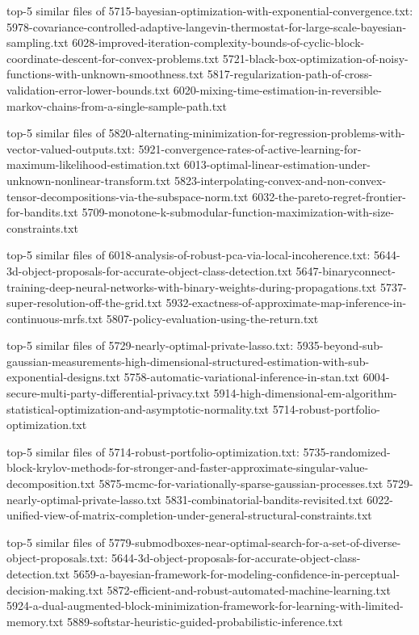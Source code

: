 \documentclass[11pt]{article}
\begin{document}
top-5 similar files of
5715-bayesian-optimization-with-exponential-convergence.txt:
5978-covariance-controlled-adaptive-langevin-thermostat-for-large-scale-bayesian-sampling.txt
6028-improved-iteration-complexity-bounds-of-cyclic-block-coordinate-descent-for-convex-problems.txt
5721-black-box-optimization-of-noisy-functions-with-unknown-smoothness.txt
5817-regularization-path-of-cross-validation-error-lower-bounds.txt
6020-mixing-time-estimation-in-reversible-markov-chains-from-a-single-sample-path.txt

top-5 similar files of
5820-alternating-minimization-for-regression-problems-with-vector-valued-outputs.txt:
5921-convergence-rates-of-active-learning-for-maximum-likelihood-estimation.txt
6013-optimal-linear-estimation-under-unknown-nonlinear-transform.txt
5823-interpolating-convex-and-non-convex-tensor-decompositions-via-the-subspace-norm.txt
6032-the-pareto-regret-frontier-for-bandits.txt
5709-monotone-k-submodular-function-maximization-with-size-constraints.txt

top-5 similar files of
6018-analysis-of-robust-pca-via-local-incoherence.txt:
5644-3d-object-proposals-for-accurate-object-class-detection.txt
5647-binaryconnect-training-deep-neural-networks-with-binary-weights-during-propagations.txt
5737-super-resolution-off-the-grid.txt
5932-exactness-of-approximate-map-inference-in-continuous-mrfs.txt
5807-policy-evaluation-using-the-return.txt

top-5 similar files of 5729-nearly-optimal-private-lasso.txt:
5935-beyond-sub-gaussian-measurements-high-dimensional-structured-estimation-with-sub-exponential-designs.txt
5758-automatic-variational-inference-in-stan.txt
6004-secure-multi-party-differential-privacy.txt
5914-high-dimensional-em-algorithm-statistical-optimization-and-asymptotic-normality.txt
5714-robust-portfolio-optimization.txt

top-5 similar files of 5714-robust-portfolio-optimization.txt:
5735-randomized-block-krylov-methods-for-stronger-and-faster-approximate-singular-value-decomposition.txt
5875-mcmc-for-variationally-sparse-gaussian-processes.txt
5729-nearly-optimal-private-lasso.txt
5831-combinatorial-bandits-revisited.txt
6022-unified-view-of-matrix-completion-under-general-structural-constraints.txt

top-5 similar files of
5779-submodboxes-near-optimal-search-for-a-set-of-diverse-object-proposals.txt:
5644-3d-object-proposals-for-accurate-object-class-detection.txt
5659-a-bayesian-framework-for-modeling-confidence-in-perceptual-decision-making.txt
5872-efficient-and-robust-automated-machine-learning.txt
5924-a-dual-augmented-block-minimization-framework-for-learning-with-limited-memory.txt
5889-softstar-heuristic-guided-probabilistic-inference.txt
\end{document}
